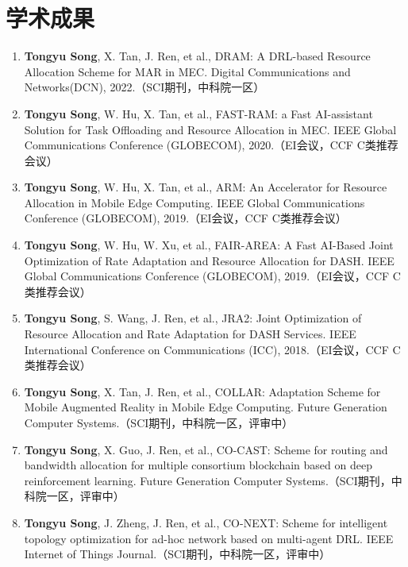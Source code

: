 \documentclass{resume}
\begin{document}
\section{学术成果}
\begin{enumerate}
  \item \textbf{Tongyu Song}, X. Tan, J. Ren, et al., DRAM: A DRL-based Resource Allocation Scheme for MAR in MEC.
  Digital Communications and Networks(DCN), 2022.（SCI期刊，中科院一区）
  \item \textbf{Tongyu Song}, W. Hu, X. Tan, et al., FAST-RAM: a Fast AI-assistant Solution for Task Offloading and Resource Allocation in MEC. IEEE Global Communications Conference (GLOBECOM), 2020.（EI会议，CCF C类推荐会议）
  \item \textbf{Tongyu Song}, W. Hu, X. Tan, et al., ARM: An Accelerator for Resource Allocation in Mobile Edge Computing. IEEE Global Communications Conference (GLOBECOM), 2019.（EI会议，CCF C类推荐会议）
  \item \textbf{Tongyu Song}, W. Hu, W. Xu, et al., FAIR-AREA: A Fast AI-Based Joint Optimization of Rate Adaptation and Resource Allocation for DASH. IEEE Global Communications Conference (GLOBECOM), 2019.（EI会议，CCF C类推荐会议）
  \item \textbf{Tongyu Song}, S. Wang, J. Ren, et al., JRA2: Joint Optimization of Resource Allocation and Rate Adaptation for DASH Services. IEEE International Conference on Communications (ICC), 2018.（EI会议，CCF C类推荐会议）
  \item \textbf{Tongyu Song}, X. Tan, J. Ren, et al., COLLAR: Adaptation Scheme for Mobile Augmented Reality in Mobile Edge Computing. Future Generation Computer Systems.（SCI期刊，中科院一区，评审中）
  \item\textbf{Tongyu Song}, X. Guo, J. Ren, et al., CO-CAST: Scheme for routing and bandwidth allocation for multiple consortium blockchain based on deep reinforcement learning. Future Generation Computer Systems.（SCI期刊，中科院一区，评审中）
  \item\textbf{Tongyu Song}, J. Zheng, J. Ren, et al., CO-NEXT: Scheme for intelligent topology optimization for ad-hoc network based on multi-agent DRL. IEEE Internet of Things Journal.（SCI期刊，中科院一区，评审中）
\end{enumerate}
\end{document}
